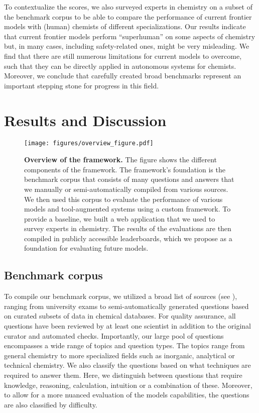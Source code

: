 \documentclass[11pt, oneside]{article}
\begin{document}
\begin{refsection}
To contextualize the scores, we also surveyed  experts in chemistry on a subset of the benchmark corpus to be able to compare the performance of current frontier models with (human) chemists of different specializations.
Our results indicate that current frontier models perform \enquote{superhuman} on some aspects of chemistry but, in many cases, including safety-related ones, might be very misleading.
We find that there are still numerous limitations for current models to overcome, such that they can be directly applied in autonomous systems for chemists.
Moreover, we conclude that carefully created broad benchmarks represent an important stepping stone for progress in this field.  %

\section{Results and Discussion}

\begin{figure}
    \texttt{[image: figures/overview\_figure.pdf]}
    \caption{\textbf{Overview of the \chembench framework.} The figure shows the different components of the \chembench framework. 
    The framework's foundation is the benchmark corpus that consists of many questions and answers that we manually or semi-automatically compiled from various sources.
    We then used this corpus to evaluate the performance of various models and tool-augmented systems using a custom framework. To provide a baseline, we built a web application that we used to survey experts in chemistry.
    The results of the evaluations are then compiled in publicly accessible leaderboards, which we propose as a foundation for evaluating future models.
    }
    \label{fig:overview_figure}
\end{figure}

\subsection{Benchmark corpus}

To compile our benchmark corpus, we utilized a broad list of sources (see ), ranging from university exams to semi-automatically generated questions based on curated subsets of data in chemical databases.
For quality assurance, all questions have been reviewed by at least one scientist in addition to the original curator and automated checks. 
Importantly, our large pool of questions encompasses a wide range of topics and question types. The topics range from general chemistry to more specialized fields such as inorganic, analytical or technical chemistry. 
We also classify the questions based on what techniques are required to answer them. Here, we distinguish between questions that require knowledge, reasoning, calculation, intuition or a combination of these.
Moreover, to allow for a more nuanced evaluation of the models capabilities, the questions are also classified by difficulty.


\end{refsection}
\end{document}
